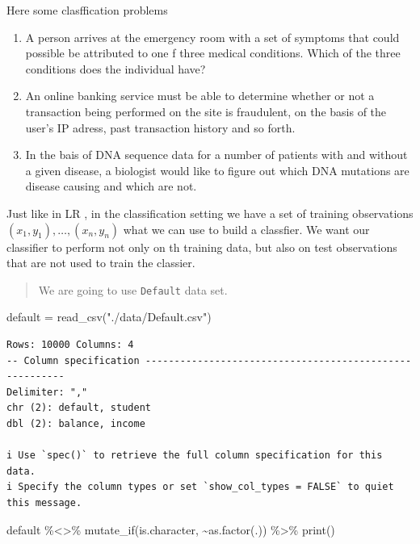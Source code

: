 \documentclass[
  letterpaper,
  DIV=11,
  numbers=noendperiod]{scrreprt}
\newenvironment{Shaded}{\begin{snugshade}}{\end{snugshade}}
\newcommand{\FunctionTok}[1]{\textcolor[rgb]{0.02,0.16,0.49}{#1}}
\newcommand{\NormalTok}[1]{\textcolor[rgb]{0.33,0.33,0.33}{#1}}
\newcommand{\OtherTok}[1]{\textcolor[rgb]{0.85,0.12,0.09}{#1}}
\newcommand{\SpecialCharTok}[1]{\textcolor[rgb]{0.00,0.46,0.62}{#1}}
\newcommand{\StringTok}[1]{\textcolor[rgb]{0.00,0.50,0.00}{#1}}
\begin{document}
Here some clasffication problems

\begin{enumerate}
\def\labelenumi{\arabic{enumi}.}
\item
  A person arrives at the emergency room with a set of symptoms that
  could possible be attributed to one f three medical conditions. Which
  of the three conditions does the individual have?
\item
  An online banking service must be able to determine whether or not a
  transaction being performed on the site is fraudulent, on the basis of
  the user's IP adress, past transaction history and so forth.
\item
  In the bais of DNA sequence data for a number of patients with and
  without a given disease, a biologist would like to figure out which
  DNA mutations are disease causing and which are not.
\end{enumerate}

Just like in LR , in the classification setting we have a set of
training observations \((x_1,y_1), \dots, (x_n,y_n)\) what we can use to
build a classfier. We want our classifier to perform not only on th
training data, but also on test observations that are not used to train
the classier.

\begin{quote}
We are going to use \texttt{Default} data set.
\end{quote}

\begin{Shaded}
\begin{Highlighting}[]
\NormalTok{default }\OtherTok{=} \FunctionTok{read\_csv}\NormalTok{(}\StringTok{"./data/Default.csv"}\NormalTok{)}
\end{Highlighting}
\end{Shaded}

\begin{verbatim}
Rows: 10000 Columns: 4
-- Column specification --------------------------------------------------------
Delimiter: ","
chr (2): default, student
dbl (2): balance, income

i Use `spec()` to retrieve the full column specification for this data.
i Specify the column types or set `show_col_types = FALSE` to quiet this message.
\end{verbatim}

\begin{Shaded}
\begin{Highlighting}[]
\NormalTok{default }\SpecialCharTok{\%\textless{}\textgreater{}\%} 
  \FunctionTok{mutate\_if}\NormalTok{(is.character, }\SpecialCharTok{\textasciitilde{}}\FunctionTok{as.factor}\NormalTok{(.)) }\SpecialCharTok{\%\textgreater{}\%} 
  \FunctionTok{print}\NormalTok{()}
\end{Highlighting}
\end{Shaded}
\end{document}
